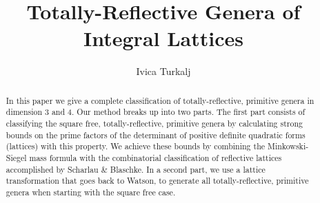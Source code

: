 \documentclass{amsart}
\theoremstyle{definition}
\theoremstyle{remark}
\begin{document}
\title{Totally-Reflective Genera of Integral Lattices}
\author{Ivica Turkalj}

\begin{abstract} 
 In this paper we give a complete classification of totally-reflective, primitive genera in dimension 3 and 4. Our method breaks up into two parts. 
 The first part consists of classifying the square free, totally-reflective, primitive genera by calculating strong bounds on the prime factors of the determinant of positive definite
 quadratic forms (lattices) with this property. 
 We achieve these bounds by combining the Minkowski-Siegel mass formula with the combinatorial classification of reflective lattices accomplished by Scharlau \& Blaschke. In a second part,
 we use a lattice transformation that goes back to Watson, to generate all totally-reflective, primitive genera when starting with the square free case. 
\end{abstract}

\maketitle
\end{document}
